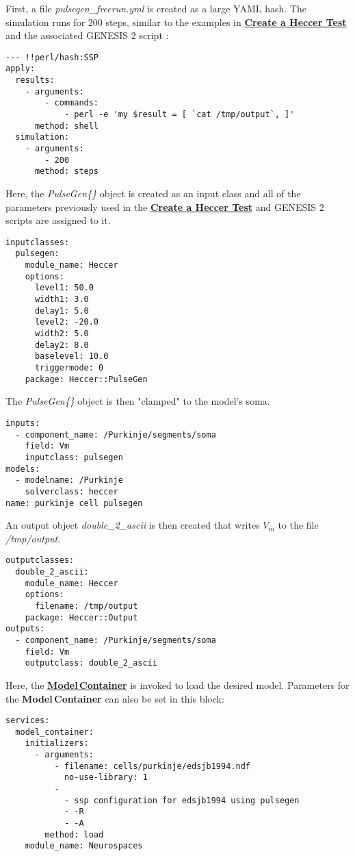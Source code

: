 \documentclass[12pt]{article}
\begin{document}
First, a file {\it pulsegen\_freerun.yml} is created as a large YAML hash. The simulation runs for 200 steps, similar to the examples in \href{../genesis-create-test-heccer/genesis-create-test-heccer.tex}{\bf Create a Heccer Test} and the associated GENESIS 2 script :
\begin{verbatim}
--- !!perl/hash:SSP
apply:
  results:
    - arguments:
        - commands:
            - perl -e 'my $result = [ `cat /tmp/output`, ]'
      method: shell
  simulation:
    - arguments:
        - 200
      method: steps
\end{verbatim}
Here, the {\it PulseGen\{\}} object is created as an input class and all of the parameters previously used in the \href{../genesis-create-test-heccer/genesis-create-test-heccer.tex}{\bf Create a Heccer Test} and GENESIS 2 scripts are assigned to it.
\begin{verbatim}
inputclasses:
  pulsegen:
    module_name: Heccer
    options:
      level1: 50.0
      width1: 3.0
      delay1: 5.0
      level2: -20.0
      width2: 5.0
      delay2: 8.0
      baselevel: 10.0
      triggermode: 0
    package: Heccer::PulseGen
\end{verbatim}
The  {\it PulseGen\{\}} object is then "clamped" to the model's soma.
\begin{verbatim}
inputs:
  - component_name: /Purkinje/segments/soma
    field: Vm
    inputclass: pulsegen
models:
  - modelname: /Purkinje
    solverclass: heccer
name: purkinje cell pulsegen
\end{verbatim}
An output object {\it double\_2\_ascii} is then created that writes $V_m$ to the file {\it /tmp/output}.
\begin{verbatim}
outputclasses:
  double_2_ascii:
    module_name: Heccer
    options:
      filename: /tmp/output
    package: Heccer::Output
outputs:
  - component_name: /Purkinje/segments/soma
    field: Vm
    outputclass: double_2_ascii
\end{verbatim}
Here, the \href{../model-container/model-container.tex}{\bf Model\,Container} is invoked to load the desired model. Parameters for the {\bf Model\,Container} can also be set in this block:
\begin{verbatim}
services:
  model_container:
    initializers:
      - arguments:
          - filename: cells/purkinje/edsjb1994.ndf
            no-use-library: 1
          -
            - ssp configuration for edsjb1994 using pulsegen
            - -R
            - -A
        method: load
    module_name: Neurospaces
\end{verbatim}
\end{document}
